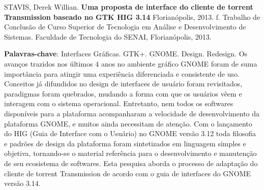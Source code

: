 
\noindent
STAVIS, Derek Willian. \textbf{Uma proposta de interface do cliente de torrent Transmission baseado no GTK HIG 3.14}
Florianópolis, 2013. \pageref{nropaginas}f. Trabalho de Conclusão de Curso Superior de Tecnologia em
Análise e Desenvolvimento de Sistemas. Faculdade de Tecnologia do
SENAI, Florianópolis, 2013.

\vspace{1cm}
\setlength{\absparsep}{18pt} %
\begin{resumo}
 \textbf{Palavras-chave}: Interfaces Gráficas. GTK+. GNOME. Design. Redesign.
 Os avanços trazidos nos últimos 4 anos no ambiente gráfico GNOME foram de suma
 importância para atingir uma experiência diferenciada e consistente de uso.
 Conceitos já difundidos no design de interfaces de usuário foram revisitados,
 paradigmas foram quebrados, mudando a forma com que os usuários vêem e 
 interagem com o sistema operacional.
 Entretanto, nem todos os softwares disponíveis para a plataforma acompanharam
 a velocidade de desenvolvimento da plataforma GNOME, e muitos ainda necessitam
 de atenção.
 Com o lançamento do HIG (Guia de Interface com o Usuário) no GNOME versão 3.12
 toda filosofia e padrões de design da plataforma foram sintetizados em 
 linguagem simples e objetiva, tornando-se o material referência para o 
 desenvolvimento e manutenção de seu ecosistema de softwares.
 Esta pesquisa aborda o processo de adaptação do cliente de torrent Transmission
 de acordo com o guia de interfaces do GNOME versão 3.14.
 
 
\end{resumo}
